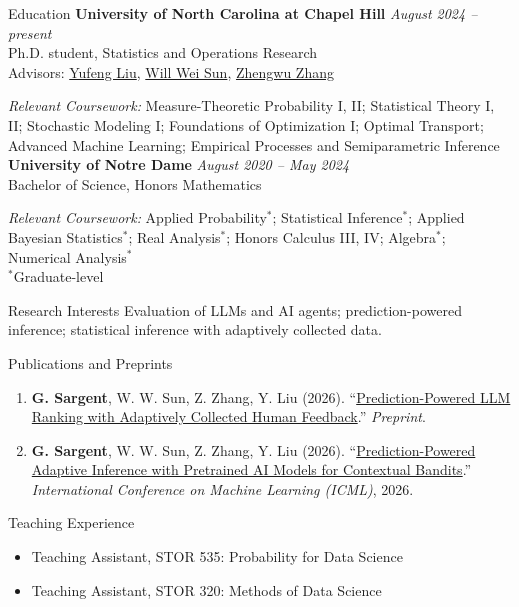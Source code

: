 \documentclass{resume}
\begin{document}
\begin{rSection}{Education}
{\bf University of North Carolina at Chapel Hill} \hfill {\em August 2024 -- present}
\\ Ph.D. student, Statistics and Operations Research
\\ Advisors: \href{https://sites.google.com/umich.edu/yufengliu/home}{Yufeng Liu}, \href{https://web.ics.purdue.edu/~sun244/}{Will Wei Sun}, \href{https://zhengwu.github.io/}{Zhengwu Zhang}

\emph{Relevant Coursework:} Measure-Theoretic Probability I, II; Statistical Theory I, II; Stochastic Modeling I; Foundations of Optimization I; Optimal Transport; Advanced Machine Learning; Empirical Processes and Semiparametric Inference
\\[4pt]
{\bf University of Notre Dame} \hfill {\em August 2020 -- May 2024}
\\ Bachelor of Science, Honors Mathematics

\emph{Relevant Coursework:} Applied Probability$^*$; Statistical Inference$^*$; Applied Bayesian Statistics$^*$; Real Analysis$^*$; Honors Calculus III, IV; Algebra$^*$; Numerical Analysis$^*$
\\[-1pt]
{\footnotesize $^*$Graduate-level}
\end{rSection}
\begin{rSection}{Research Interests}
Evaluation of LLMs and AI agents; prediction-powered inference; statistical inference with adaptively collected data.
\end{rSection}
\begin{rSection}{Publications and Preprints}
\begin{enumerate}[leftmargin=*,nosep]
\item \textbf{G. Sargent}, W. W. Sun, Z. Zhang, Y. Liu (2026). \textquotedblleft\href{https://arxiv.org/abs/2611.13186}{Prediction-Powered LLM Ranking with Adaptively Collected Human Feedback}.'' \emph{Preprint}.
\item \textbf{G. Sargent}, W. W. Sun, Z. Zhang, Y. Liu (2026). \textquotedblleft\href{https://proceedings.mlr.press/v306/sargent26a.html}{Prediction-Powered Adaptive Inference with Pretrained AI Models for Contextual Bandits}.'' \emph{International Conference on Machine Learning (ICML)}, 2026.
\end{enumerate}
\end{rSection}
\begin{rSection}{Teaching Experience}
\begin{itemize}[leftmargin=*,nosep]
\item Teaching Assistant, STOR 535: Probability for Data Science
\item Teaching Assistant, STOR 320: Methods of Data Science
\end{itemize}
\end{rSection}
\end{document}
